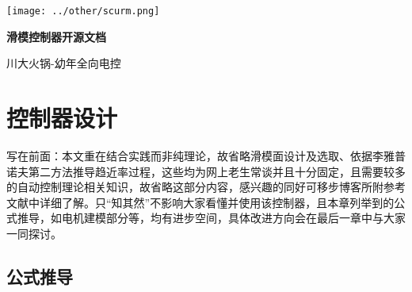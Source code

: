 \documentclass[12pt]{article}
\begin{document}
    \begin{titlepage}
        \centering
        \texttt{[image: ../other/scurm.png]} 
        \vspace{2cm}  %

        {\Huge \bfseries 滑模控制器开源文档}

        \vspace{1cm}
        {\Large 川大火锅-幼年全向电控}

        \vfill  %
    \end{titlepage}

\newpage
\tableofcontents
\newpage  %

\section{控制器设计}
写在前面：本文重在结合实践而非纯理论，故省略滑模面设计及选取、依据李雅普诺夫第二方法推导趋近率过程，这些均为网上老生常谈并且十分固定，且需要较多的自动控制理论相关知识，故省略这部分内容，感兴趣的同好可移步博客所附参考文献中详细了解。只“知其然”不影响大家看懂并使用该控制器，且本章列举到的公式推导，如电机建模部分等，均有进步空间，具体改进方向会在最后一章中与大家一同探讨。
    \subsection{公式推导}
\end{document}

